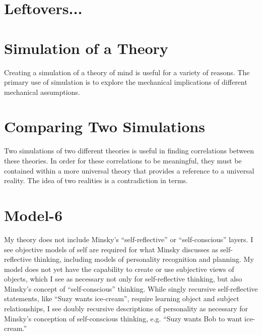 \section{Leftovers...}

\section{Simulation of a Theory}

Creating a simulation of a theory of mind is useful for a variety of
reasons.  The primary use of simulation is to explore the mechanical
implications of different mechanical assumptions.

\section{Comparing Two Simulations}

Two simulations of two different theories is useful in finding
correlations between these theories.  In order for these correlations
to be meaningful, they must be contained within a more universal
theory that provides a reference to a universal reality.  The idea of
two realities is a contradiction in terms.


\section{Model-6}

My theory does not include Minsky's ``self-reflective'' or
``self-conscious'' layers.  I see objective models of self are
required for what Minsky discusses as self-reflective thinking,
including models of personality recognition and planning.  My model
does not yet have the capability to create or use subjective views of
objects, which I see as necessary not only for self-reflective
thinking, but also Minsky's concept of ``self-conscious'' thinking.
While singly recursive self-reflective statements, like ``Suzy wants
ice-cream'', require learning object and subject relationships, I see
doubly recursive descriptions of personality as necessary for Minsky's
conception of self-conscious thinking, e.g. ``Suzy wants Bob to want
ice-cream.''

